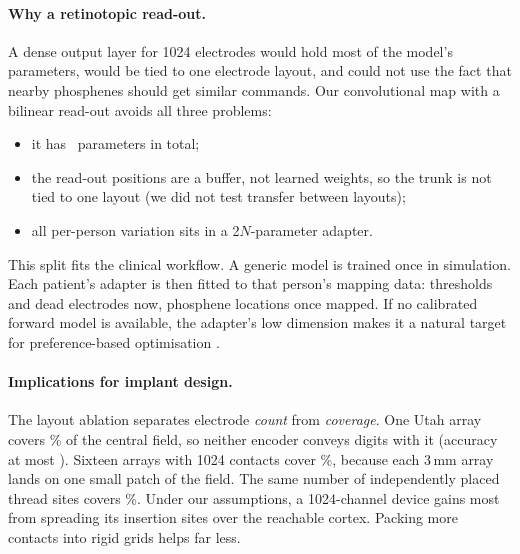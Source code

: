 \paragraph{Why a retinotopic read-out.} A dense output layer for 1024 electrodes would hold most of the model's parameters, would be tied to one electrode layout, and could not use the fact that nearby phosphenes should get similar commands. Our convolutional map with a bilinear read-out avoids all three problems:
\begin{itemize}
\item it has \NumEncParams\ parameters in total;
\item the read-out positions are a buffer, not learned weights, so the trunk is not tied to one layout (we did not test transfer between layouts);
\item all per-person variation sits in a 2$N$-parameter adapter.
\end{itemize}
This split fits the clinical workflow. A generic model is trained once in simulation. Each patient's adapter is then fitted to that person's mapping data: thresholds and dead electrodes now, phosphene locations once mapped. If no calibrated forward model is available, the adapter's low dimension makes it a natural target for preference-based optimisation \citep{granley2023human}.

\paragraph{Implications for implant design.} The layout ablation separates electrode \emph{count} from \emph{coverage}. One Utah array covers \NumCovUtahNine\% of the central field, so neither encoder conveys digits with it (accuracy at most \AbUtahAIntAcc). Sixteen arrays with 1024 contacts cover \NumCovUtahThou\%, because each 3\,mm array lands on one small patch of the field. The same number of independently placed thread sites covers \NumCovThrThou\%. Under our assumptions, a 1024-channel device gains most from spreading its insertion sites over the reachable cortex. Packing more contacts into rigid grids helps far less.

